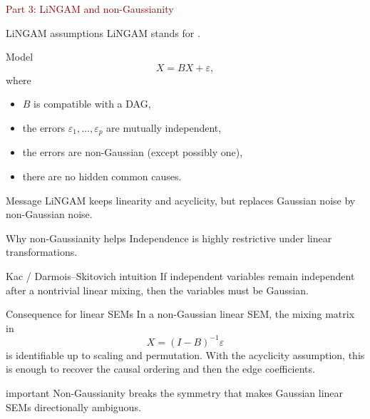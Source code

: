 \documentclass[dvipsnames,aspectratio=169,handout]{beamer}
\begin{document}
\begin{frame}{}
\begin{center}
{\Huge \textcolor{DarkRed}{Part 3: LiNGAM and non-Gaussianity}}
\end{center}
\end{frame}

\begin{frame}{LiNGAM assumptions}
LiNGAM stands for .

\begin{alertblock}{Model}
\[
X = BX + \varepsilon,
\]
where
\begin{itemize}
    \item $B$ is compatible with a DAG,
    \item the errors $\varepsilon_1,\dots,\varepsilon_p$ are mutually independent,
    \item the errors are non-Gaussian (except possibly one),
    \item there are no hidden common causes.
\end{itemize}
\end{alertblock}

\begin{block}{Message}
LiNGAM keeps linearity and acyclicity, but replaces Gaussian noise by non-Gaussian noise.
\end{block}
\end{frame}

\begin{frame}{Why non-Gaussianity helps}
Independence is highly restrictive under linear transformations.

\begin{block}{Kac / Darmois--Skitovich intuition}
If independent variables remain independent after a nontrivial linear mixing,
then the variables must be Gaussian.
\end{block}

\begin{alertblock}{Consequence for linear SEMs}
In a non-Gaussian linear SEM, the mixing matrix in
\[
X = (I-B)^{-1}\varepsilon
\]
is identifiable up to scaling and permutation.
With the acyclicity assumption, this is enough to recover the causal ordering
and then the edge coefficients.
\end{alertblock}

\begin{beamercolorbox}[wd=\textwidth,sep=7pt,center,rounded=true,shadow=true]{important}
Non-Gaussianity breaks the symmetry that makes Gaussian linear SEMs directionally ambiguous.
\end{beamercolorbox}
\end{frame}
\end{document}

